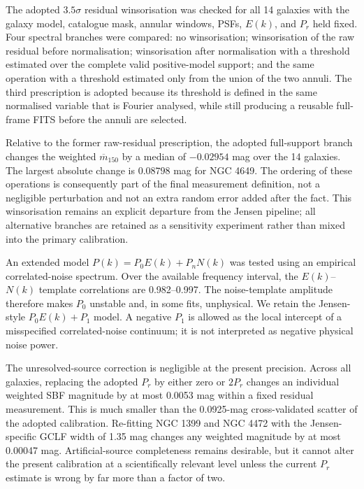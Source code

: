 \documentclass[nodoi,nocopyright]{pas}
\newcommand{\mbar}{\overline{m}}
\begin{document}
The adopted $3.5\sigma$ residual winsorisation was checked for all 14 galaxies
with the galaxy model, catalogue mask, annular windows, PSFs, $E(k)$, and
$P_r$ held fixed.  Four spectral branches were compared: no winsorisation;
winsorisation of the raw residual before normalisation; winsorisation after
normalisation with a threshold estimated over the complete valid
positive-model support; and the same operation with a threshold estimated
only from the union of the two annuli.  The third prescription is adopted
because its threshold is defined in the same normalised variable that is
Fourier analysed, while still producing a reusable full-frame FITS before the
annuli are selected.

Relative to the former raw-residual prescription, the adopted full-support
branch changes the weighted $\mbar_{150}$ by a median of $-0.02954$ mag over
the 14 galaxies.  The largest absolute change is $0.08798$ mag for NGC 4649.
The ordering of these operations is consequently part of the final
measurement definition, not a negligible perturbation and not an extra random
error added after the fact.  This winsorisation remains an explicit departure
from the Jensen pipeline; all alternative branches are retained as a
sensitivity experiment rather than mixed into the primary calibration.

An extended model $P(k)=P_0E(k)+P_nN(k)$ was tested using an empirical
correlated-noise spectrum. Over the available frequency interval, the
$E(k)$--$N(k)$ template correlations are 0.982--0.997. The noise-template
amplitude therefore makes $P_0$ unstable and, in some fits, unphysical. We
retain the Jensen-style $P_0E(k)+P_1$ model. A negative $P_1$ is allowed as the local
intercept of a misspecified correlated-noise continuum; it is not interpreted
as negative physical noise power.

The unresolved-source correction is negligible at the present precision.
Across all galaxies, replacing the adopted $P_r$ by either zero or $2P_r$
changes an individual weighted SBF magnitude by at most 0.0053 mag within a
fixed residual measurement. This is much smaller than the 0.0925-mag
cross-validated scatter of the adopted calibration. Re-fitting NGC 1399 and NGC 4472 with the
Jensen-specific GCLF width of 1.35 mag changes any weighted magnitude by at
most 0.00047 mag. Artificial-source completeness remains desirable, but it
cannot alter the present calibration at a scientifically relevant level
unless the current $P_r$ estimate is wrong by far more than a factor of two.
\end{document}
